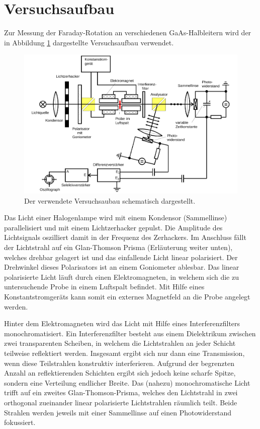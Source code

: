 \newpage
\section{Versuchsaufbau}
\label{sec:Aufbau}

Zur Messung der Faraday-Rotation an verschiedenen GaAs-Halbleitern wird
der in Abbildung \ref{fig:Aufbau} dargestellte Versuchsaufbau verwendet.

\begin{figure}
  \centering
  \includegraphics[width=\textwidth]{images/aufbau.pdf}
  \caption{Der verwendete Versuchsaubau schematisch dargestellt\cite[11]{anleitung}.}
  \label{fig:Aufbau}
\end{figure}

Das Licht einer Halogenlampe wird mit einem Kondensor (Sammellinse) parallelisiert
und mit einem Lichtzerhacker gepulst.
Die Amplitude des Lichtsignals oszilliert damit in der Frequenz des
Zerhackers. Im Anschluss fällt der Lichtstrahl auf ein Glan-Thomson
Prisma (Erläuterung weiter unten),
welches drehbar gelagert ist und das einfallende Licht linear polarisiert.
Der Drehwinkel dieses Polarisators ist an einem Goniometer ablesbar.
Das linear polarisierte Licht läuft durch einen Elektromagneten,
in welchem sich die zu untersuchende Probe in einem Luftspalt befindet.
Mit Hilfe eines Konstantstromgeräts kann somit ein externes Magnetfeld
an die Probe angelegt werden.

Hinter dem Elektromagneten wird das Licht mit Hilfe eines
Interferenzfilters monochromatisiert.
Ein Interferenzfilter besteht aus einem Dielektrikum zwischen zwei
transparenten Scheiben, in welchem die Lichtstrahlen an jeder
Schicht teilweise reflektiert werden. Insgesamt ergibt sich nur dann
eine Transmission, wenn diese Teilstrahlen konstruktiv interferieren.
Aufgrund der begrenzten Anzahl an reflektierenden Schichten ergibt sich
jedoch keine scharfe Spitze, sondern eine Verteilung endlicher Breite.
Das (nahezu) monochromatische Licht trifft auf ein zweites Glan-Thomson-Prisma,
welches den Lichtstrahl in zwei orthogonal zueinander
linear polarisierte Lichtstrahlen räumlich teilt.
Beide Strahlen werden jeweils mit einer Sammellinse auf einen
Photowiderstand fokussiert.

